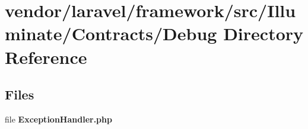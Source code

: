 \section{vendor/laravel/framework/src/\+Illuminate/\+Contracts/\+Debug Directory Reference}
\label{dir_13d6deec1ee959fc900ec03d8e6735c6}
\subsection*{Files}
\begin{DoxyCompactItemize}
\item 
file {\bf Exception\+Handler.\+php}
\end{DoxyCompactItemize}
